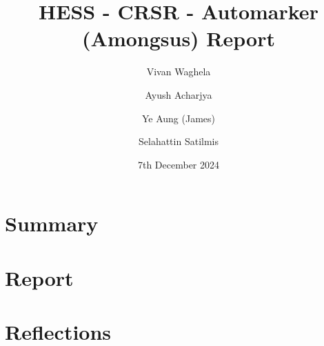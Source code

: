 \documentclass[a4paper, 12pt]{article}
\begin{document}
\title{HESS - CRSR - Automarker (Amongsus) Report}
\author{Vivan Waghela \and Ayush Acharjya \and Ye Aung (James) \and Selahattin Satilmis}
\date{7th December 2024}
\maketitle

\section*{Summary}

\section*{Report}

\section*{Reflections}
\end{document}
